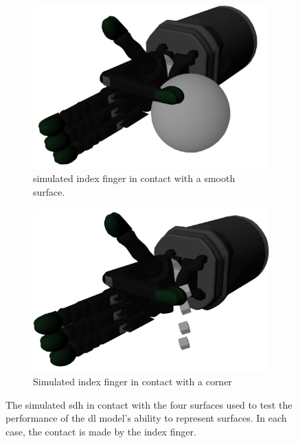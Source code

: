 \begin{figure}[!h]
\begin{subfigure}[b]{0.24\textwidth}
	\end{subfigure}
	\hfill
	\begin{subfigure}[b]{0.24\textwidth}
		\centering
		\includegraphics[width=\textwidth]{chapters/1-tactile-perception/fig/screen-shots/smooth-contact.png}
		\caption{simulated index finger in contact with a smooth surface.}
		\label{fig:smooth-contact-experimental}
	\end{subfigure}
	\hfill
	\begin{subfigure}[b]{0.24\textwidth}
		\centering
		\includegraphics[width=\textwidth]{chapters/1-tactile-perception/fig/screen-shots/corner-contact.png}
		\caption{Simulated index finger in contact with a corner}
		\label{fig:corner-contact-experimental}
	\end{subfigure}
		\caption{The simulated \gls{sdh} in contact with the four surfaces used to test the performance of the \gls{dl} model's ability to represent surfaces. In each case, the contact is made by the index finger.}
		\label{fig:experimental-setup-tactile-perception-experimental}
\end{figure}

